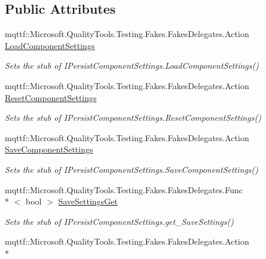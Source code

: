 \subsection*{Public Attributes}
\begin{DoxyCompactItemize}
\item 
mqttf\-::\-Microsoft.\-Quality\-Tools.\-Testing.\-Fakes.\-Fakes\-Delegates.\-Action \hyperlink{class_system_1_1_configuration_1_1_fakes_1_1_stub_i_persist_component_settings_a0aba527a6c8567d66f5ab936941b6f41}{Load\-Component\-Settings}
\begin{DoxyCompactList}\small\item\em Sets the stub of I\-Persist\-Component\-Settings.\-Load\-Component\-Settings()\end{DoxyCompactList}\item 
mqttf\-::\-Microsoft.\-Quality\-Tools.\-Testing.\-Fakes.\-Fakes\-Delegates.\-Action \hyperlink{class_system_1_1_configuration_1_1_fakes_1_1_stub_i_persist_component_settings_ad5774e66a65b3a926679e325b9ae84ec}{Reset\-Component\-Settings}
\begin{DoxyCompactList}\small\item\em Sets the stub of I\-Persist\-Component\-Settings.\-Reset\-Component\-Settings()\end{DoxyCompactList}\item 
mqttf\-::\-Microsoft.\-Quality\-Tools.\-Testing.\-Fakes.\-Fakes\-Delegates.\-Action \hyperlink{class_system_1_1_configuration_1_1_fakes_1_1_stub_i_persist_component_settings_ad4cf0f9516f3cdedd4da3c8907f5125e}{Save\-Component\-Settings}
\begin{DoxyCompactList}\small\item\em Sets the stub of I\-Persist\-Component\-Settings.\-Save\-Component\-Settings()\end{DoxyCompactList}\item 
mqttf\-::\-Microsoft.\-Quality\-Tools.\-Testing.\-Fakes.\-Fakes\-Delegates.\-Func\\*
$<$ bool $>$ \hyperlink{class_system_1_1_configuration_1_1_fakes_1_1_stub_i_persist_component_settings_ac9802a6e8e7aad73602ae13f17f6b5df}{Save\-Settings\-Get}
\begin{DoxyCompactList}\small\item\em Sets the stub of I\-Persist\-Component\-Settings.\-get\-\_\-\-Save\-Settings()\end{DoxyCompactList}\item 
mqttf\-::\-Microsoft.\-Quality\-Tools.\-Testing.\-Fakes.\-Fakes\-Delegates.\-Action\\*

\end{DoxyCompactItemize}
